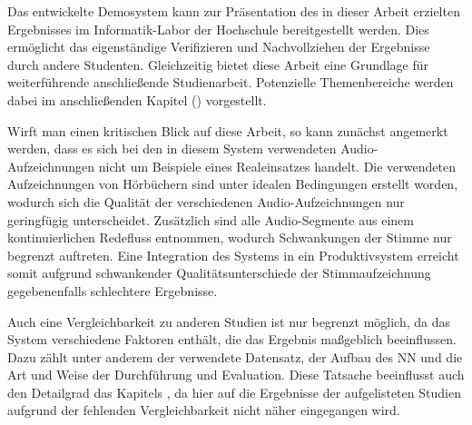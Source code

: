 Das entwickelte Demosystem kann zur Präsentation des in dieser Arbeit erzielten Ergebnisses im Informatik-Labor der Hochschule bereitgestellt werden.
Dies ermöglicht das eigenständige Verifizieren und Nachvollziehen der Ergebnisse durch andere Studenten.
Gleichzeitig bietet diese Arbeit eine Grundlage für weiterführende anschließende Studienarbeit.
Potenzielle Themenbereiche werden dabei im anschließenden Kapitel () vorgestellt. 

Wirft man einen kritischen Blick auf diese Arbeit, so kann zunächst angemerkt werden, dass es sich bei den in diesem System verwendeten Audio-Aufzeichnungen nicht um Beispiele eines Realeinsatzes handelt.
Die verwendeten Aufzeichnungen von Hörbüchern sind unter idealen Bedingungen erstellt worden, wodurch sich die Qualität der verschiedenen Audio-Aufzeichnungen nur geringfügig unterscheidet.
Zusätzlich sind alle Audio-Segmente aus einem kontinuierlichen Redefluss entnommen, wodurch Schwankungen der Stimme nur begrenzt auftreten.
Eine Integration des Systems in ein Produktivsystem erreicht somit aufgrund schwankender Qualitätsunterschiede der Stimmaufzeichnung gegebenenfalls schlechtere Ergebnisse.

Auch eine Vergleichbarkeit zu anderen Studien ist nur begrenzt möglich, da das System verschiedene Faktoren enthält, die das Ergebnis maßgeblich beeinflussen.
Dazu zählt unter anderem der verwendete Datensatz, der Aufbau des \ac{NN} und die Art und Weise der Durchführung und Evaluation.
Diese Tatsache beeinflusst auch den Detailgrad das Kapitels , da hier auf die Ergebnisse der aufgelisteten Studien aufgrund der fehlenden Vergleichbarkeit nicht näher eingegangen wird.



